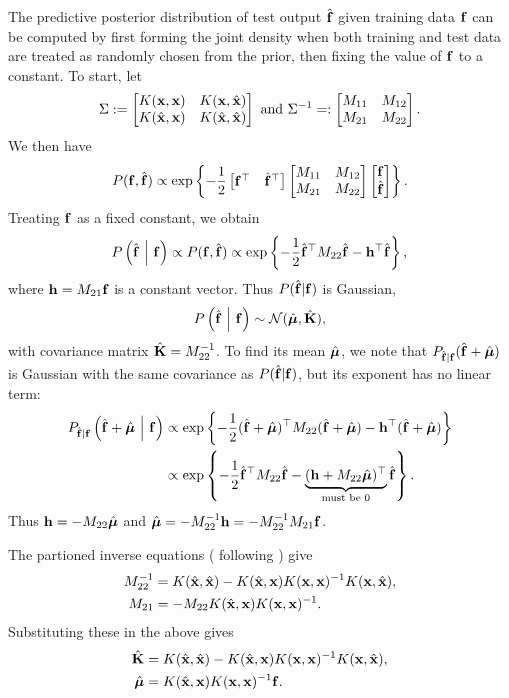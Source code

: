 The predictive posterior distribution of test output $\hat{\mathbf{f}}$ given training data $\mathbf{f}$ can be computed by first forming the joint density when both training and test data are treated as randomly chosen from the prior, then fixing the value of $\mathbf{f}$ to a constant.  To start, let
\[
  \Sigma := \begin{bmatrix} 
    K(\mathbf{x}, \mathbf{x})     & K(\mathbf{x}, \hat{\mathbf{x}})     \\
    K(\hat{\mathbf{x}}, \mathbf{x}) & K(\hat{\mathbf{x}}, \hat{\mathbf{x}})
   \end{bmatrix}
  \text{ and }
  \Sigma^{-1} =: \begin{bmatrix} 
    M_{11} & M_{12} \\
    M_{21} & M_{22}
   \end{bmatrix}.
\]
We then have
\[
  P(\mathbf{f}, \hat{\mathbf{f}})
  \propto
  \exp\left\{ 
    -\frac12
    \begin{bmatrix} \mathbf{f}^\top & \hat{\mathbf{f}}^\top \end{bmatrix}
    \begin{bmatrix} M_{11} & M_{12} \\ M_{21} & M_{22} \end{bmatrix}
    \begin{bmatrix} \mathbf{f} \\ \hat{\mathbf{f}} \end{bmatrix}
   \right\}.
\]
Treating $\mathbf{f}$ as a fixed constant, we obtain
\[
  P\left( \hat{\mathbf{f}} \ \middle\vert\  \mathbf{f} \right)
  \propto
  P(\mathbf{f}, \hat{\mathbf{f}})
  \propto
  \exp\left\{ 
    -\frac12 \hat{\mathbf{f}}^\top M_{22} \hat{\mathbf{f}}
    - \mathbf{h}^\top \hat{\mathbf{f}}
   \right\},
\]
where $\mathbf{h} = M_{21} \mathbf{f}$ is a constant vector.  Thus $P(\hat{\mathbf{f}} | \mathbf{f})$ is Gaussian,
\begin{equation}
  P\left( \hat{\mathbf{f}} \ \middle\vert\  \mathbf{f} \right) \sim \mathcal{N}(\hat{\bm{\mu}}, \hat{\mathbf{K}}),
\end{equation}
with covariance matrix $\hat{\mathbf{K}} = M_{22}^{-1}$.  To find its mean $\hat{\bm{\mu}}$, we note that $P_{\hat{\mathbf{f}}|\mathbf{f}}(\hat{\mathbf{f}} + \hat{\bm{\mu}})$ is Gaussian with the same covariance as $P(\hat{\mathbf{f}} | \mathbf{f})$, but its exponent has no linear term:
\begin{align*}
  P_{\hat{\mathbf{f}}|\mathbf{f}} \left( \hat{\mathbf{f}} + \hat{\bm{\mu}} \ \middle\vert\  \mathbf{f} \right)
  &\propto
  \exp\left\{ 
    -\frac12 (\hat{\mathbf{f}} + \hat{\bm{\mu}})^\top M_{22} (\hat{\mathbf{f}} + \hat{\bm{\mu}})
    - \mathbf{h}^\top (\hat{\mathbf{f}} + \hat{\bm{\mu}})
   \right\} \\
  &\propto
  \exp\left\{ 
    -\frac12 \hat{\mathbf{f}}^\top M_{22} \hat{\mathbf{f}}
    - \underbrace{(\mathbf{h} + M_{22} \hat{\bm{\mu}})^\top}_{\text{must be $0$}} \hat{\mathbf{f}}
   \right\}.
\end{align*}
Thus $\mathbf{h} = -M_{22} \hat{\bm{\mu}}$ and $\hat{\bm{\mu}} = -M_{22}^{-1} \mathbf{h} = -M_{22}^{-1} M_{21} \mathbf{f}$.

The partioned inverse equations (\citealp*{barnett1979matrix} following \citealp*{mackay1998introduction}) give
\begin{align*}
  M_{22}^{-1} &= K(\hat{\mathbf{x}},\hat{\mathbf{x}}) - K(\hat{\mathbf{x}},\mathbf{x}) K(\mathbf{x},\mathbf{x})^{-1} K(\mathbf{x},\hat{\mathbf{x}}), \\
  M_{21} &= -M_{22} K(\hat{\mathbf{x}},\mathbf{x}) K(\mathbf{x},\mathbf{x})^{-1}.
\end{align*}
Substituting these in the above gives
\begin{align}
  \hat{\mathbf{K}} &= K(\hat{\mathbf{x}},\hat{\mathbf{x}}) - K(\hat{\mathbf{x}},\mathbf{x}) K(\mathbf{x},\mathbf{x})^{-1} K(\mathbf{x},\hat{\mathbf{x}}), \\
  \hat{\bm{\mu}} &= K(\hat{\mathbf{x}},\mathbf{x}) K(\mathbf{x},\mathbf{x})^{-1}\mathbf{f}.
\end{align}

